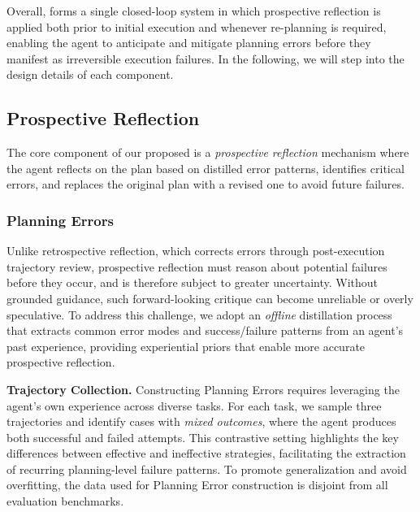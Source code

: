 Overall, \method forms a single closed-loop system in which prospective reflection is applied both prior to initial execution and whenever re-planning is required, enabling the agent to anticipate and mitigate planning errors before they manifest as irreversible execution failures. In the following, we will step into the design details of each component.








\subsection{Prospective Reflection}
\label{subsec:reflect}

The core component of our proposed \method is a \textit{prospective reflection} mechanism where the agent reflects on the plan based on distilled error patterns, identifies critical errors, and replaces the original plan with a revised one to avoid future failures.

\subsubsection{Planning Errors}
\label{subsubsec:plan_error}
Unlike retrospective reflection, which corrects errors through post-execution trajectory review, prospective reflection must reason about potential failures before they occur, and is therefore subject to greater uncertainty. Without grounded guidance, such forward-looking critique can become unreliable or overly speculative. To address this challenge, we adopt an \emph{offline} distillation process that extracts common error modes and success/failure patterns from an agent’s past experience, providing experiential priors that enable more accurate prospective reflection.





\noindent\textbf{Trajectory Collection.} 
Constructing Planning Errors requires leveraging the agent’s own experience across diverse tasks. For each task, we sample three trajectories and identify cases with \textit{mixed outcomes}, where the agent produces both successful and failed attempts. This contrastive setting highlights the key differences between effective and ineffective strategies, facilitating the extraction of recurring planning-level failure patterns. To promote generalization and avoid overfitting, the data used for Planning Error construction is disjoint from all evaluation benchmarks.

